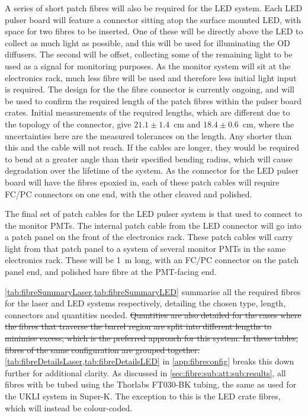 \documentclass[a4paper,11pt]{article}
\providecommand{\DIFdeltex}[1]{{\protect\color{red}\sout{#1}}}                      %
\providecommand{\DIFdelbegin}{} %
\providecommand{\DIFdelend}{} %
\providecommand{\DIFdel}[1]{\texorpdfstring{\DIFdeltex{#1}}{}} %
\newcommand{\DIFscaledelfig}{0.5}
\newlength{\DIFdelgraphicswidth} %
\newlength{\DIFdelgraphicsheight} %
\newcommand{\DIFdelincludegraphics}[2][]{%
\sbox{\DIFdelgraphicsbox}{\DIFOincludegraphics[#1]{#2}}%
\settoboxwidth{\DIFdelgraphicswidth}{\DIFdelgraphicsbox} %
\settoboxtotalheight{\DIFdelgraphicsheight}{\DIFdelgraphicsbox} %
\scalebox{\DIFscaledelfig}{%
\parbox[b]{\DIFdelgraphicswidth}{\usebox{\DIFdelgraphicsbox}\\[-\baselineskip] \rule{\DIFdelgraphicswidth}{0em}}\llap{\resizebox{\DIFdelgraphicswidth}{\DIFdelgraphicsheight}{%
\setlength{\unitlength}{\DIFdelgraphicswidth}%
\begin{picture}(1,1)%
\thicklines\linethickness{2pt} %
{\color[rgb]{1,0,0}\put(0,0){\framebox(1,1){}}}%
{\color[rgb]{1,0,0}\put(0,0){\line( 1,1){1}}}%
{\color[rgb]{1,0,0}\put(0,1){\line(1,-1){1}}}%
\end{picture}%
}\hspace*{3pt}}} %
} %
\DeclareRobustCommand{\DIFdelbegin}{\DIFOdelbegin \let\includegraphics\DIFdelincludegraphics} %
\DeclareRobustCommand{\DIFdelend}{\DIFOaddend \let\includegraphics\DIFOincludegraphics} %
\begin{document}
A series of short patch fibres will also be required for the LED system. Each LED pulser board will feature a connector sitting atop the surface mounted LED, with space for two fibres to be inserted. One of these will be directly above the LED to collect as much light as possible, and this will be used for illuminating the OD diffusers. The second will be offset, collecting some of the remaining light to be used as a signal for monitoring purposes. As the monitor system will sit at the electronics rack, much less fibre will be used and therefore less initial light input is required. The design for the the fibre connector is currently ongoing, and will be used to confirm the required length of the patch fibres within the pulser board crates. Initial measurements of the required lengths, which are different due to the topology of the connector, give $21.1\pm1.4$~cm and $18.4\pm0.6$~cm, where the uncertainties here are the measured tolerances on the length. Any shorter than this and the cable will not reach. If the cables are longer, they would be required to bend at a greater angle than their specified bending radius, which will cause degradation over the lifetime of the system. As the connector for the LED pulser board will have the fibres epoxied in, each of these patch cables will require FC/PC connectors on one end, with the other cleaved and polished.

The final set of patch cables for the LED pulser system is that used to connect to the monitor PMTs. The internal patch cable from the LED connector will go into a patch panel on the front of the electronics rack. These patch cables will carry light from that patch panel to a system of several monitor PMTs in the same electronics rack. These will be 1~m long, with an FC/PC connector on the patch panel end, and polished bare fibre at the PMT-facing end.

\cref{tab:fibreSummaryLaser,tab:fibreSummaryLED} summarise all the required fibres for the laser and LED systems respectively, detailing the chosen type, length, connectors and quantities needed. \DIFdelbegin \DIFdel{Quantities are also detailed for the cases where the fibres that traverse the barrel region are split into different lengths to minimise excess, which is the preferred approach for this system. In these tables, fibres of the same configuration are grouped together. }\DIFdelend \cref{tab:fibreDetailsLaser,tab:fibreDetailsLED} in \cref{app:fibreconfig} breaks this down further for additional clarity. As discussed in \cref{sec:fibre:sub:att:sub:results}, all fibres with be tubed using the Thorlabs FT030-BK tubing, the same as used for the UKLI system in Super-K. The exception to this is the LED crate fibres, which will instead be colour-coded.
\end{document}
